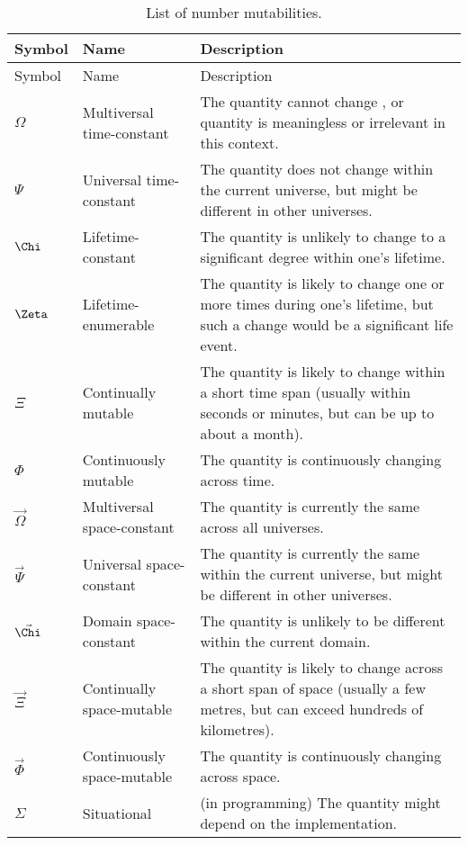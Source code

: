 \documentclass{book}
\begin{document}
\begin{longtabu} to \linewidth{llY}
  \caption{List of number mutabilities.} \\
  
  Symbol & Name & Description \\
  \hline
  \endfirsthead
  
  Symbol & Name & Description \\
  \hline
  \endhead
  
  \endfoot
  
  \endlastfoot

  $\Omega$ & Multiversal time-constant & The quantity cannot change , or quantity is meaningless or irrelevant in this context. \\
  $\Psi$ & Universal time-constant & The quantity does not change within the current universe, but might be different in other universes. \\
  $\Chi$ & Lifetime-constant & The quantity is unlikely to change to a significant degree within one's lifetime. \\
  $\Zeta$ & Lifetime-enumerable & The quantity is likely to change one or more times during one's lifetime, but such a change would be a significant life event. \\
  $\Xi$ & Continually mutable & The quantity is likely to change within a short time span (usually within seconds or minutes, but can be up to about a month). \\
  $\Phi$ & Continuously mutable & The quantity is continuously changing across time. \\
  $\vec{\Omega}$ & Multiversal space-constant & The quantity is currently the same across all universes. \\
  $\vec{\Psi}$ & Universal space-constant & The quantity is currently the same within the current universe, but might be different in other universes. \\
  $\vec{\Chi}$ & Domain space-constant & The quantity is unlikely to be different within the current domain. \\
  $\vec{\Xi}$ & Continually space-mutable & The quantity is likely to change across a short span of space (usually a few metres, but can exceed hundreds of kilometres). \\
  $\vec{\Phi}$ & Continuously space-mutable & The quantity is continuously changing across space. \\
  $\Sigma$ & Situational & (in programming) The quantity might depend on the implementation. \\
\end{longtabu}
\end{document}
